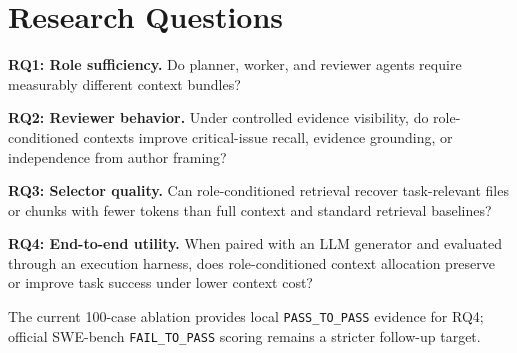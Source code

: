 \section{Research Questions}

\textbf{RQ1: Role sufficiency.} Do planner, worker, and reviewer agents require measurably different context bundles?

\textbf{RQ2: Reviewer behavior.} Under controlled evidence visibility, do role-conditioned contexts improve critical-issue recall, evidence grounding, or independence from author framing?

\textbf{RQ3: Selector quality.} Can role-conditioned retrieval recover task-relevant files or chunks with fewer tokens than full context and standard retrieval baselines?

\textbf{RQ4: End-to-end utility.} When paired with an LLM generator and evaluated through an execution harness, does role-conditioned context allocation preserve or improve task success under lower context cost?

The current 100-case ablation provides local \texttt{PASS\_TO\_PASS} evidence for RQ4; official SWE-bench \texttt{FAIL\_TO\_PASS} scoring remains a stricter follow-up target.
